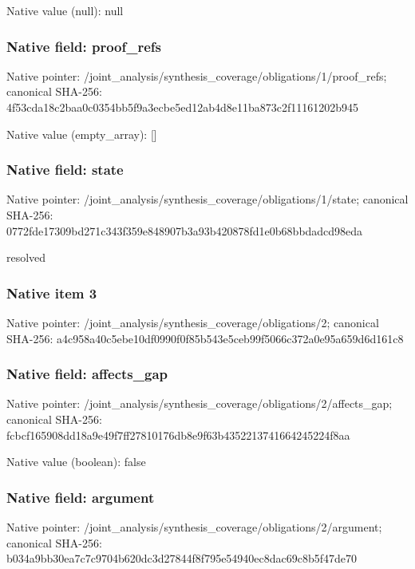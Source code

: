 \documentclass[10pt,a4paper]{article}
\begin{document}
Native value (null): null

\subsubsection{Native field: proof\_\allowbreak{}refs}
Native pointer: /joint\_\allowbreak{}analysis/synthesis\_\allowbreak{}coverage/obligations/1/proof\_\allowbreak{}refs; canonical SHA-256: 4f53cda18c2baa0c0354bb5f9a3ecbe5ed12ab4d8e11ba873c2f11161202b945

Native value (empty\_\allowbreak{}array): []

\subsubsection{Native field: state}
Native pointer: /joint\_\allowbreak{}analysis/synthesis\_\allowbreak{}coverage/obligations/1/state; canonical SHA-256: 0772fde17309bd271c343f359e848907b3a93b420878fd1e0b68bbdadcd98eda

\begingroup\raggedright\sloppy resolved\par\endgroup

\subsubsection{Native item 3}
Native pointer: /joint\_\allowbreak{}analysis/synthesis\_\allowbreak{}coverage/obligations/2; canonical SHA-256: a4c958a40c5ebe10df0990f0f85b543e5ceb99f5066c372a0e95a659d6d161c8

\subsubsection{Native field: affects\_\allowbreak{}gap}
Native pointer: /joint\_\allowbreak{}analysis/synthesis\_\allowbreak{}coverage/obligations/2/affects\_\allowbreak{}gap; canonical SHA-256: fcbcf165908dd18a9e49f7ff27810176db8e9f63b4352213741664245224f8aa

Native value (boolean): false

\subsubsection{Native field: argument}
Native pointer: /joint\_\allowbreak{}analysis/synthesis\_\allowbreak{}coverage/obligations/2/argument; canonical SHA-256: b034a9bb30ea7c7c9704b620dc3d27844f8f795e54940ec8dac69c8b5f47de70
\end{document}
